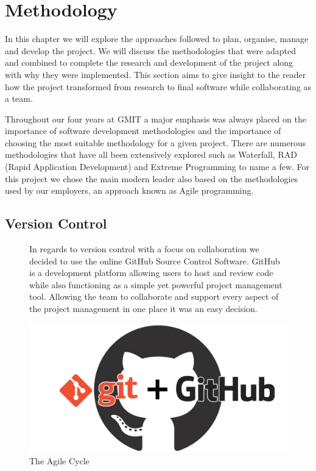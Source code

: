 \chapter{Methodology}
In this chapter we will explore the approaches followed to plan, organise, manage and develop the project. We will discuss the methodologies that were adapted and combined to complete the research and development of the project along with why they were implemented. This section aims to give insight to the reader how the project transformed from research to final software while collaborating as a team.

Throughout our four years at GMIT a major emphasis was always placed on the importance of software development methodologies and the importance of choosing the most suitable methodology for a given project. There are numerous  methodologies that have all been extensively explored such as Waterfall, RAD (Rapid Application Development) and Extreme Programming to name a few. For this project we chose the main modern leader also based on the methodologies used by our employers, an approach known as Agile programming.

\section{Version Control}
\begin{figure}[H]
\begin{minipage}{.5\textwidth}  %
\lstset{linewidth = 4cm, breaklines=true} %
In regards to version control with a focus on collaboration we decided to use the online GitHub Source Control Software. GitHub is a development platform allowing users to host and review code while also functioning as a simple yet powerful project management tool. Allowing the team to collaborate and support every aspect of the project management in one place it was an easy decision. 

\end{minipage}
\qquad %
\begin{minipage}{0.4\textwidth} %
 \includegraphics[width=\linewidth]{img/git.jpeg}
\caption{The Agile Cycle}
\end{minipage}
\end{figure}

